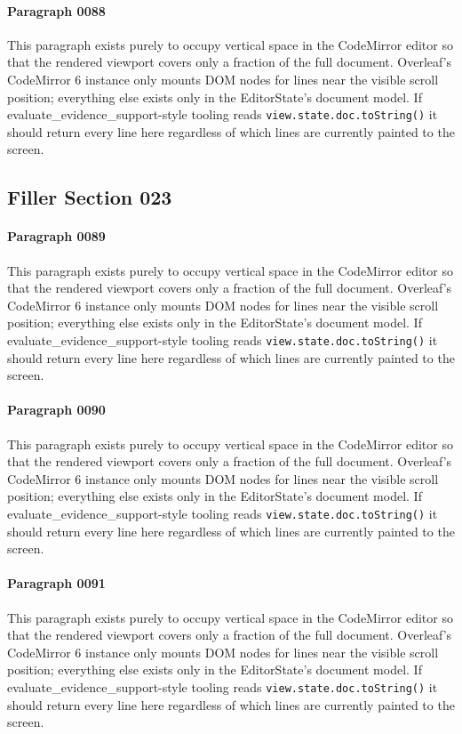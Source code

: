 \documentclass{article}
\begin{document}
\paragraph{Paragraph 0088}
This paragraph exists purely to occupy vertical space in the CodeMirror editor so that the rendered viewport covers only a fraction of the full document. Overleaf's CodeMirror 6 instance only mounts DOM nodes for lines near the visible scroll position; everything else exists only in the EditorState's document model. If evaluate\_evidence\_support-style tooling reads \texttt{view.state.doc.toString()} it should return every line here regardless of which lines are currently painted to the screen.

\subsection{Filler Section 023}
\paragraph{Paragraph 0089}
This paragraph exists purely to occupy vertical space in the CodeMirror editor so that the rendered viewport covers only a fraction of the full document. Overleaf's CodeMirror 6 instance only mounts DOM nodes for lines near the visible scroll position; everything else exists only in the EditorState's document model. If evaluate\_evidence\_support-style tooling reads \texttt{view.state.doc.toString()} it should return every line here regardless of which lines are currently painted to the screen.

\paragraph{Paragraph 0090}
This paragraph exists purely to occupy vertical space in the CodeMirror editor so that the rendered viewport covers only a fraction of the full document. Overleaf's CodeMirror 6 instance only mounts DOM nodes for lines near the visible scroll position; everything else exists only in the EditorState's document model. If evaluate\_evidence\_support-style tooling reads \texttt{view.state.doc.toString()} it should return every line here regardless of which lines are currently painted to the screen.

\paragraph{Paragraph 0091}
This paragraph exists purely to occupy vertical space in the CodeMirror editor so that the rendered viewport covers only a fraction of the full document. Overleaf's CodeMirror 6 instance only mounts DOM nodes for lines near the visible scroll position; everything else exists only in the EditorState's document model. If evaluate\_evidence\_support-style tooling reads \texttt{view.state.doc.toString()} it should return every line here regardless of which lines are currently painted to the screen.
\end{document}
